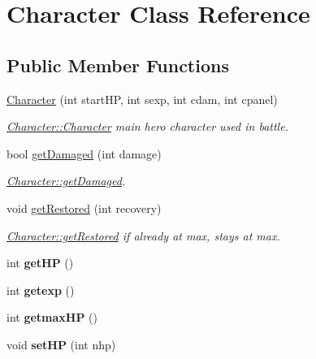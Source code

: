 \hypertarget{class_character}{\section{Character Class Reference}
\label{class_character}
}
\subsection*{Public Member Functions}
\begin{DoxyCompactItemize}
\item 
\hyperlink{class_character_a663231826f9b61c5802228f9b7b743ad}{Character} (int start\-H\-P, int sexp, int cdam, int cpanel)
\begin{DoxyCompactList}\small\item\em \hyperlink{class_character_a663231826f9b61c5802228f9b7b743ad}{Character\-::\-Character} main hero character used in battle. \end{DoxyCompactList}\item 
bool \hyperlink{class_character_af92b5cb1ab23f30e9aa3371e10e331fe}{get\-Damaged} (int damage)
\begin{DoxyCompactList}\small\item\em \hyperlink{class_character_af92b5cb1ab23f30e9aa3371e10e331fe}{Character\-::get\-Damaged}. \end{DoxyCompactList}\item 
void \hyperlink{class_character_a9e80c446cdcb4651dc321adc80125999}{get\-Restored} (int recovery)
\begin{DoxyCompactList}\small\item\em \hyperlink{class_character_a9e80c446cdcb4651dc321adc80125999}{Character\-::get\-Restored} if already at max, stays at max. \end{DoxyCompactList}\item 
\hypertarget{class_character_a6f222adddaed0b313094d33700251c6b}{int {\bfseries get\-H\-P} ()}\label{class_character_a6f222adddaed0b313094d33700251c6b}

\item 
\hypertarget{class_character_a0cc4b7dbbaad0f639db856ddfca2e268}{int {\bfseries getexp} ()}\label{class_character_a0cc4b7dbbaad0f639db856ddfca2e268}

\item 
\hypertarget{class_character_a67f56cdab1f01f561073dfcdcf228fda}{int {\bfseries getmax\-H\-P} ()}\label{class_character_a67f56cdab1f01f561073dfcdcf228fda}

\item 
\hypertarget{class_character_a5ee4e596c276d23c486f564c25afe11c}{void {\bfseries set\-H\-P} (int nhp)}\label{class_character_a5ee4e596c276d23c486f564c25afe11c}


\end{DoxyCompactItemize}
